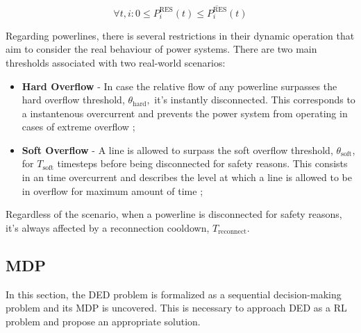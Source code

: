 \begin{equation} \label{eq:res-limits}
	\forall t, i: 0 \leq P^\text{RES}_i (t) \leq \overline{P^\text{RES}_i} (t)
\end{equation}

Regarding powerlines, there is several restrictions in their dynamic operation that aim to consider the real behaviour of power systems. There are two main thresholds associated with two real-world scenarios:

\begin{itemize}
	\item \textbf{Hard Overflow} - In case the relative flow of any powerline surpasses the hard overflow threshold, $\theta_\text{hard},$ it's instantly disconnected. This corresponds to a instantenous overcurrent and prevents the power system from operating in cases of extreme overflow \cite{rtefranceGrid2OpDocumentation};
	\item \textbf{Soft Overflow} - A line is allowed to surpass the soft overflow threshold, $\theta_\text{soft}$, for $T_\text{soft}$ timesteps before being disconnected for safety reasons. This consists in an time overcurrent and describes the level at which a line is allowed to be in overflow for maximum amount of time \cite{rtefranceGrid2OpDocumentation};
\end{itemize}
Regardless of the scenario, when a powerline is disconnected for safety reasons, it's always affected by a reconnection cooldown, $T_\text{reconnect}$.

\subsection{\acf{MDP}} \label{sec:method-mdp}

In this section, the \ac{DED} problem is formalized as a sequential decision-making problem and its \ac{MDP} is uncovered. This is necessary to approach \ac{DED} as a \ac{RL} problem and propose an appropriate solution. 

